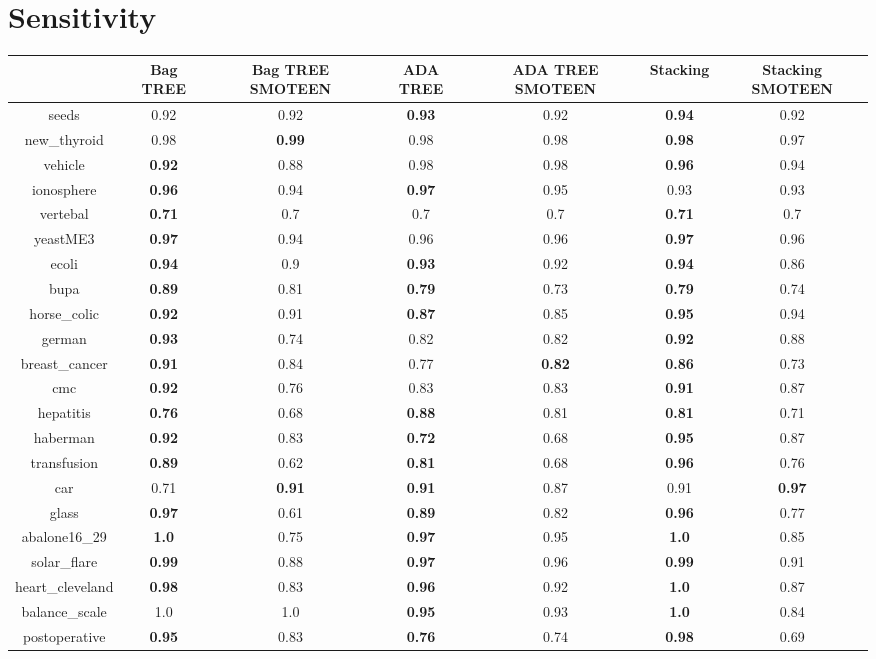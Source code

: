 \documentclass{article}%
\begin{document}
%
\section*{Sensitivity}%
\begin{tabular}{c|cccccc}%
&Bag TREE&Bag TREE SMOTEEN&ADA TREE&ADA TREE SMOTEEN&Stacking&Stacking SMOTEEN\\%
\hline%
seeds&0.92&0.92&\textbf{0.93}&0.92&\textbf{0.94}&0.92\\%
new\_thyroid&0.98&\textbf{0.99}&0.98&0.98&\textbf{0.98}&0.97\\%
vehicle&\textbf{0.92}&0.88&0.98&0.98&\textbf{0.96}&0.94\\%
ionosphere&\textbf{0.96}&0.94&\textbf{0.97}&0.95&0.93&0.93\\%
vertebal&\textbf{0.71}&0.7&0.7&0.7&\textbf{0.71}&0.7\\%
yeastME3&\textbf{0.97}&0.94&0.96&0.96&\textbf{0.97}&0.96\\%
ecoli&\textbf{0.94}&0.9&\textbf{0.93}&0.92&\textbf{0.94}&0.86\\%
bupa&\textbf{0.89}&0.81&\textbf{0.79}&0.73&\textbf{0.79}&0.74\\%
horse\_colic&\textbf{0.92}&0.91&\textbf{0.87}&0.85&\textbf{0.95}&0.94\\%
german&\textbf{0.93}&0.74&0.82&0.82&\textbf{0.92}&0.88\\%
breast\_cancer&\textbf{0.91}&0.84&0.77&\textbf{0.82}&\textbf{0.86}&0.73\\%
cmc&\textbf{0.92}&0.76&0.83&0.83&\textbf{0.91}&0.87\\%
hepatitis&\textbf{0.76}&0.68&\textbf{0.88}&0.81&\textbf{0.81}&0.71\\%
haberman&\textbf{0.92}&0.83&\textbf{0.72}&0.68&\textbf{0.95}&0.87\\%
transfusion&\textbf{0.89}&0.62&\textbf{0.81}&0.68&\textbf{0.96}&0.76\\%
car&0.71&\textbf{0.91}&\textbf{0.91}&0.87&0.91&\textbf{0.97}\\%
glass&\textbf{0.97}&0.61&\textbf{0.89}&0.82&\textbf{0.96}&0.77\\%
abalone16\_29&\textbf{1.0}&0.75&\textbf{0.97}&0.95&\textbf{1.0}&0.85\\%
solar\_flare&\textbf{0.99}&0.88&\textbf{0.97}&0.96&\textbf{0.99}&0.91\\%
heart\_cleveland&\textbf{0.98}&0.83&\textbf{0.96}&0.92&\textbf{1.0}&0.87\\%
balance\_scale&1.0&1.0&\textbf{0.95}&0.93&\textbf{1.0}&0.84\\%
postoperative&\textbf{0.95}&0.83&\textbf{0.76}&0.74&\textbf{0.98}&0.69\\%
\end{tabular}
\end{document}
